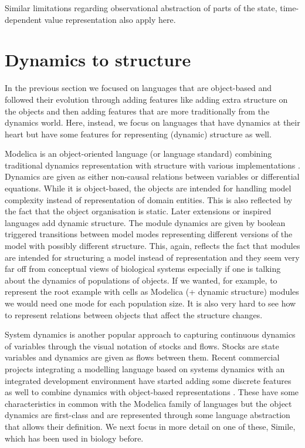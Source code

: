 Similar limitations regarding observational abstraction of parts of the state,
time-dependent value representation also apply here.

\section{Dynamics to structure}
\label{sec:dyns}
In the previous section we focused on languages that are object-based and
followed their evolution through adding features like adding extra structure on
the objects and then adding features that are more traditionally from the
dynamics world. Here, instead, we focus on languages that have dynamics at their
heart but have some features for representing (dynamic) structure as
well.

Modelica is an object-oriented language (or language standard) combining
traditional dynamics representation with structure
\citep{fritzson_modelicaunified_1998} with various implementations
\citep{otter_modeling_1996, li_hybrid_2007}. Dynamics are given as either
non-causal relations between variables or differential equations. While it is
object-based, the objects are intended for handling model complexity instead of
representation of domain entities. This is also reflected by the fact that the
object organisation is static. Later extensions
\citep{nytsch-geusen_mosilab:_2005} or inspired languages
\citep{zimmer2008introducing} add dynamic structure. The module dynamics are
given by boolean triggered transitions between model modes representing
different versions of the model with possibly different structure. This, again,
reflects the fact that modules are intended for structuring a model instead of
representation and they seem very far off from conceptual views of biological
systems especially if one is talking about the dynamics of populations of
objects. If we wanted, for example, to represent the root example with cells as
Modelica (+ dynamic structure) modules we would need one mode for each
population size. It is also very hard to see how to represent relations between
objects that affect the structure changes.

System dynamics is another popular approach to capturing continuous dynamics of
variables through the visual notation of stocks and flows. Stocks are state
variables and dynamics are given as flows between them. Recent commercial
projects integrating a modelling language based on systems dynamics with an
integrated development environment have started adding some discrete features as
well to combine dynamics with object-based representations \citep[Ventity,
AnyLogic;][]{yeager_entity-based_2014, borshchev2004system}. These have some
characteristics in common with the Modelica family of languages but the object
dynamics are first-class and are represented through some language abstraction
that allows their definition. We next focus in more detail on one of these,
Simile, which has been used in biology before.


